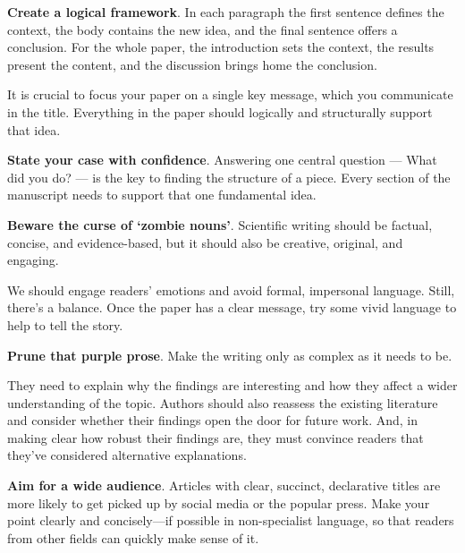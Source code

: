 \textbf{Create a logical framework}. In each paragraph the first sentence defines the context, the body contains the new idea, and the final sentence offers a conclusion. For the whole paper, the introduction sets the context, the results present the content, and the discussion brings home the conclusion.

It is crucial to focus your paper on a single key message, which you communicate in the title. Everything in the paper should logically and structurally support that idea.


\textbf{State your case with confidence}. Answering one central question --- What did you do? --- is the key to finding the structure of a piece. Every section of the manuscript needs to support that one fundamental idea.


\textbf{Beware the curse of `zombie nouns'}. Scientific writing should be factual, concise, and evidence-based, but it should also be creative, original, and engaging.

We should engage readers' emotions and avoid formal, impersonal language. Still, there's a balance. Once the paper has a clear message, try some vivid language to help to tell the story.


\textbf{Prune that purple prose}. Make the writing only as complex as it needs to be. 

They need to explain why the findings are interesting and how they affect a wider understanding of the topic. Authors should also reassess the existing literature and consider whether their findings open the door for future work. And, in making clear how robust their findings are, they must convince readers that they’ve considered alternative explanations. 


\textbf{Aim for a wide audience}. Articles with clear, succinct, declarative titles are more likely to get picked up by social media or the popular press. Make your point clearly and concisely---if possible in non-specialist language, so that readers from other fields can quickly make sense of it.
